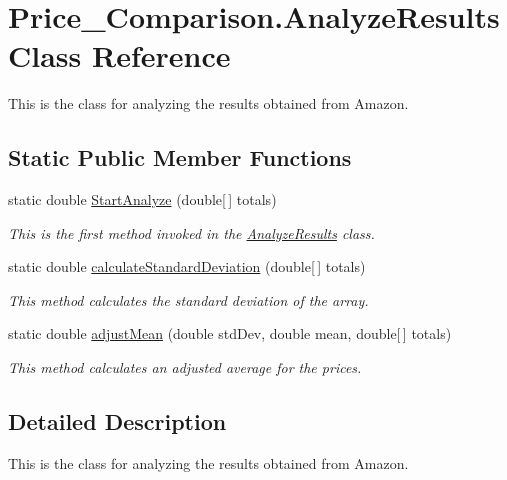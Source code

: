 \hypertarget{class_price___comparison_1_1_analyze_results}{\section{Price\-\_\-\-Comparison.\-Analyze\-Results Class Reference}
\label{class_price___comparison_1_1_analyze_results}
}


This is the class for analyzing the results obtained from Amazon.  


\subsection*{Static Public Member Functions}
\begin{DoxyCompactItemize}
\item 
static double \hyperlink{class_price___comparison_1_1_analyze_results_a2c41cccbb35581114ec69ab39dc04e11}{Start\-Analyze} (double\mbox{[}$\,$\mbox{]} totals)
\begin{DoxyCompactList}\small\item\em This is the first method invoked in the \hyperlink{class_price___comparison_1_1_analyze_results}{Analyze\-Results} class. \end{DoxyCompactList}\item 
static double \hyperlink{class_price___comparison_1_1_analyze_results_a673440bc5fa5ea7557c04094bd1762ea}{calculate\-Standard\-Deviation} (double\mbox{[}$\,$\mbox{]} totals)
\begin{DoxyCompactList}\small\item\em This method calculates the standard deviation of the array. \end{DoxyCompactList}\item 
static double \hyperlink{class_price___comparison_1_1_analyze_results_a2f11d210150bea635ec1866e3bad4bb0}{adjust\-Mean} (double std\-Dev, double mean, double\mbox{[}$\,$\mbox{]} totals)
\begin{DoxyCompactList}\small\item\em This method calculates an adjusted average for the prices. \end{DoxyCompactList}\end{DoxyCompactItemize}


\subsection{Detailed Description}
This is the class for analyzing the results obtained from Amazon. 

